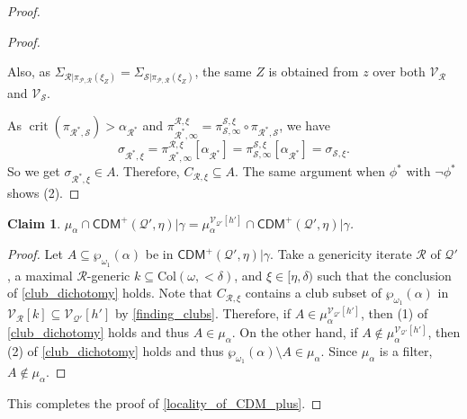 \documentclass{amsart}
\newtheorem{claim}{Claim}[dfn]
\renewcommand{\subset}{\subseteq}
\newcommand{\power}{\wp}
\DeclareMathOperator{\crit}{crit}
\begin{document}
\begin{proof}
\begin{proof}
\begin{itemize}
        Also, as $\Sigma_{\mathcal{R}\vert\pi_{\mathcal{P}, \mathcal{R}}(\xi_Z)}=\Sigma_{\mathcal{S}\vert\pi_{\mathcal{P}, \mathcal{R}}(\xi_Z)}$, the same $Z$ is obtained from $z$ over both $\mathcal{V}_{\mathcal{R}}$ and $\mathcal{V}_{\mathcal{S}}$.
    \end{itemize}
    As $\crit(\pi_{\mathcal{R}^*, \mathcal{S}})>\alpha_{\mathcal{R}^*}$ and $\pi^{\mathcal{R}, \xi}_{\mathcal{R}^*, \infty}=\pi^{\mathcal{S}, \xi}_{\mathcal{S}, \infty}\circ\pi_{\mathcal{R}^*, \mathcal{S}}$, we have
    \[
    \sigma_{\mathcal{R}^*, \xi}=\pi^{\mathcal{R}, \xi}_{\mathcal{R}^*, \infty}[\alpha_{\mathcal{R}^*}]=\pi^{\mathcal{S}, \xi}_{\mathcal{S}, \infty}[\alpha_{\mathcal{R}^*}]=\sigma_{\mathcal{S}, \xi}.
    \]
    So we get $\sigma_{\mathcal{R}^*, \xi}\in A$.
    Therefore, $C_{\mathcal{R}, \xi}\subset A$.
    The same argument when $\phi^*$ with $\neg\phi^*$ shows (2).
\end{proof}

\begin{claim}\label{agreement_between_club_filters}
    $\mu_{\alpha}\cap\mathsf{CDM}^+(\mathcal{Q}', \eta)\vert\gamma=\mu_{\alpha}^{\mathcal{V}_{\mathcal{Q'}}[h']}\cap\mathsf{CDM}^+(\mathcal{Q}', \eta)\vert\gamma$.
\end{claim}
\begin{proof}
    Let $A\subset\power_{\omega_1}(\alpha)$ be in $\mathsf{CDM}^+(\mathcal{Q}', \eta)\vert\gamma$.
    Take a genericity iterate $\mathcal{R}$ of $\mathcal{Q}'$, a maximal $\mathcal{R}$-generic $k\subset\mathrm{Col}(\omega, {<}\delta)$, and $\xi\in[\eta, \delta)$ such that the conclusion of \cref{club_dichotomy} holds.
    Note that $C_{\mathcal{R}, \xi}$ contains a club subset of $\power_{\omega_1}(\alpha)$ in $\mathcal{V}_{\mathcal{R}}[k]\subset\mathcal{V}_{\mathcal{Q}'}[h']$ by \cref{finding_clubs}.
    Therefore, if $A\in\mu_{\alpha}^{\mathcal{V}_{\mathcal{Q}'}[h']}$, then (1) of \cref{club_dichotomy} holds and thus $A\in\mu_{\alpha}$.
    On the other hand, if $A\notin\mu_{\alpha}^{\mathcal{V}_{\mathcal{Q}'}[h']}$, then (2) of \cref{club_dichotomy} holds and thus $\power_{\omega_1}(\alpha)\setminus A\in\mu_{\alpha}$.
    Since $\mu_{\alpha}$ is a filter, $A\notin\mu_{\alpha}$.
\end{proof}

This completes the proof of \cref{locality_of_CDM_plus}.
\end{proof}
\end{document}
